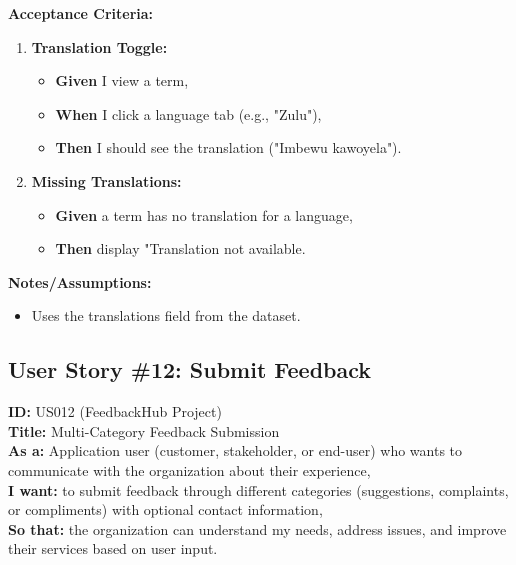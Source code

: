 \documentclass[12pt]{article}
\begin{document}
\vspace{1em}
\textbf{Acceptance Criteria:}
\begin{enumerate}
    \item \textbf{Translation Toggle:}
    \begin{itemize}
        \item \textbf{Given} I view a term,
        \item \textbf{When} I click a language tab (e.g., "Zulu"),
        \item \textbf{Then}  I should see the translation ("Imbewu kawoyela").
    \end{itemize}

    \item \textbf{Missing Translations:}
    \begin{itemize}
        \item \textbf{Given} a term has no translation for a language,
        \item \textbf{Then} display "Translation not available.
    \end{itemize}

\end{enumerate}

\vspace{1em}
\textbf{Notes/Assumptions:}
\begin{itemize}
    \item Uses the translations field from the dataset.
\end{itemize}


\subsection{User Story \#12: Submit Feedback}
\textbf{ID:} US012 (FeedbackHub Project) \\
\textbf{Title:} Multi-Category Feedback Submission \\
\textbf{As a:} Application user (customer, stakeholder, or end-user) who wants to communicate with the organization about their experience, \\
\textbf{I want:} to submit feedback through different categories (suggestions, complaints, or compliments) with optional contact information, \\
\textbf{So that:} the organization can understand my needs, address issues, and improve their services based on user input.
\end{document}

